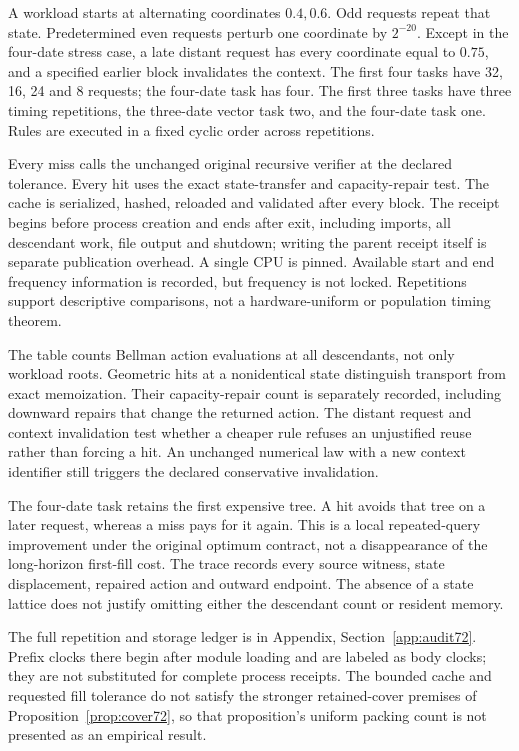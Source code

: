 A workload starts at alternating coordinates $0.4,0.6$. Odd requests repeat that state. Predetermined even requests perturb one coordinate by $2^{-20}$. Except in the four-date stress case, a late distant request has every coordinate equal to $0.75$, and a specified earlier block invalidates the context. The first four tasks have 32, 16, 24 and 8 requests; the four-date task has four. The first three tasks have three timing repetitions, the three-date vector task two, and the four-date task one. Rules are executed in a fixed cyclic order across repetitions.

Every miss calls the unchanged original recursive verifier at the declared tolerance. Every hit uses the exact state-transfer and capacity-repair test. The cache is serialized, hashed, reloaded and validated after every block. The receipt begins before process creation and ends after exit, including imports, all descendant work, file output and shutdown; writing the parent receipt itself is separate publication overhead. A single CPU is pinned. Available start and end frequency information is recorded, but frequency is not locked. Repetitions support descriptive comparisons, not a hardware-uniform or population timing theorem.



The table counts Bellman action evaluations at all descendants, not only workload roots. Geometric hits at a nonidentical state distinguish transport from exact memoization. Their capacity-repair count is separately recorded, including downward repairs that change the returned action. The distant request and context invalidation test whether a cheaper rule refuses an unjustified reuse rather than forcing a hit. An unchanged numerical law with a new context identifier still triggers the declared conservative invalidation.



The four-date task retains the first expensive tree. A hit avoids that tree on a later request, whereas a miss pays for it again. This is a local repeated-query improvement under the original optimum contract, not a disappearance of the long-horizon first-fill cost. The trace records every source witness, state displacement, repaired action and outward endpoint. The absence of a state lattice does not justify omitting either the descendant count or resident memory.

The full repetition and storage ledger is in Appendix, Section~\ref{app:audit72}. Prefix clocks there begin after module loading and are labeled as body clocks; they are not substituted for complete process receipts. The bounded cache and requested fill tolerance do not satisfy the stronger retained-cover premises of Proposition~\ref{prop:cover72}, so that proposition's uniform packing count is not presented as an empirical result.

